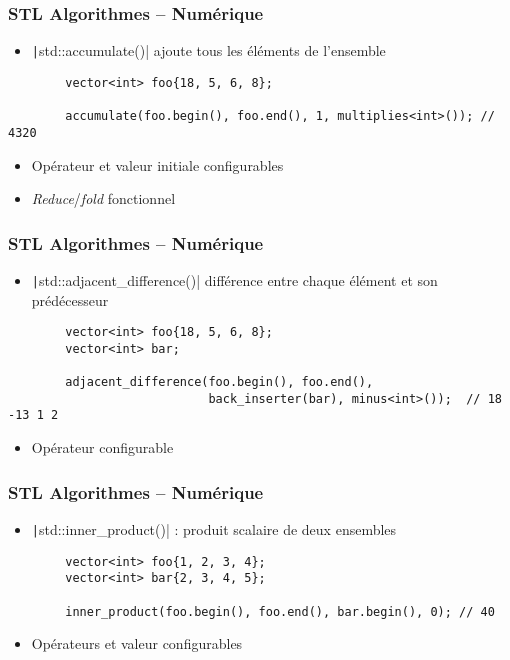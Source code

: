 \documentclass[C++.tex]{subfiles}
\begin{document}
\begin{frame}[fragile]
	\frametitle{STL Algorithmes -- Numérique}
	\begin{itemize}
		\item \texttt|std::accumulate()| \og ajoute\fg{} tous les éléments de l'ensemble
	\end{itemize}

	\begin{verbatim}
		vector<int> foo{18, 5, 6, 8};

		accumulate(foo.begin(), foo.end(), 1, multiplies<int>()); // 4320
	\end{verbatim}

	\begin{itemize}
		\item Opérateur et valeur initiale configurables
		\item \textit{Reduce}/\textit{fold} fonctionnel
	\end{itemize}
\end{frame}

\begin{frame}[fragile]
	\frametitle{STL Algorithmes -- Numérique}
	\begin{itemize}
		\item \texttt|std::adjacent_difference()| \og différence\fg{} entre chaque élément et son prédécesseur
	\end{itemize}

	\begin{verbatim}
		vector<int> foo{18, 5, 6, 8};
		vector<int> bar;

		adjacent_difference(foo.begin(), foo.end(),
		                    back_inserter(bar), minus<int>());  // 18 -13 1 2
	\end{verbatim}

	\begin{itemize}
		\item Opérateur configurable
	\end{itemize}
\end{frame}

\begin{frame}[fragile]
	\frametitle{STL Algorithmes -- Numérique}
	\begin{itemize}
		\item \texttt|std::inner_product()| : \og produit scalaire\fg{} de deux ensembles
	\end{itemize}

	\begin{verbatim}
		vector<int> foo{1, 2, 3, 4};
		vector<int> bar{2, 3, 4, 5};

		inner_product(foo.begin(), foo.end(), bar.begin(), 0); // 40
	\end{verbatim}

	\begin{itemize}
		\item Opérateurs et valeur configurables
	\end{itemize}
\end{frame}
\end{document}
